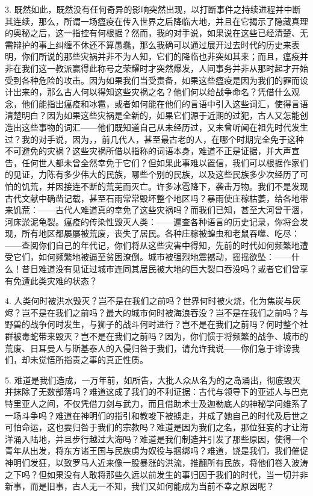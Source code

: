 3. 既然如此，既然没有任何奇异的影响突然出现，以打断事件之持续进程并中断其连续，那么，所谓一场瘟疫在传入世界之后降临大地，并且在它揭示了隐藏真理的奥秘之后，这一指控有何根据？然而，我的对手说，如果说在这些已经清楚、无需辩护的事上纠缠不休还不算愚蠢，那么我确可以通过展开过去时代的历史来表明，你们所说的那些灾祸并非不为人知，它们的降临也非突如其来；而且，瘟疫并非在我们这一教派赢得此称号之荣耀时才突然爆发，人间事务并非从那时起才开始受到各种危险的攻击。因为如果我们当受责备，如果这些瘟疫是因为我们的罪而设计出来的，那么古人何以得知这些灾祸之名？他们何以给战争命名？凭借什么观念，他们能指出瘟疫和冰雹，或者如何能在他们的言语中引入这些词汇，使得言语清楚明白？因为如果这些灾祸是全新的，如果它们源于近期的过犯，古人又怎能创造出这些事物的词汇——他们既知道自己从未经历过，又未曾听闻在祖先时代发生过？我的对手说，因为，，前几代人，甚至最古老的人，在哪个时期完全免于这种不可避免的灾祸？这些灾祸所借以指称的词语本身，难道不正是证据，并大声宣告，任何世人都未曾全然幸免于它们？但如果此事难以置信，我们可以根据作家们的见证，力陈有多少伟大的民族，哪些个别的民族，以及这些民族多少次经历了可怕的饥荒，并因接连不断的荒芜而灭亡。许多冰雹降下，袭击万物。我们不是发现古代文献中确凿记载，甚至石雨常常毁坏整个地区吗？暴雨使庄稼枯萎，给各地带来饥荒：——古代人难道真的幸免了这些灾祸吗？而我们已知，甚至大河曾干涸，河床淤泥龟裂。瘟疫的传染性毁灭人类：——遍查各种语言的历史记录，你将会发现，所有地区都屡屡被荒废，丧失了居民。各种庄稼被蝗虫和老鼠吞噬、吃尽：——查阅你们自己的年代记，你们将从这些灾害中得知，先前的时代如何频繁地遭受它们，如何频繁地被逼至贫困潦倒。城市被强烈地震撼动，摇摇欲坠：——什么！昔日难道没有见证过城市连同其居民被大地的巨大裂口吞没吗？或者它们曾享有免遭此类灾难的状态？\par

4. 人类何时被洪水毁灭？岂不是在我们之前吗？世界何时被火烧，化为焦炭与灰烬？岂不是在我们之前吗？最大的城市何时被海浪吞没？岂不是在我们之前吗？与野兽的战争何时发生，与狮子的战斗何时进行？岂不是在我们之前吗？何时整个社群被毒蛇带来毁灭？岂不是在我们之前吗？因为，你们惯于将频繁的战争、城市的荒废、日耳曼人与斯基泰人的入侵归咎于我们，请允许我说——你们急于诽谤我们，却未觉悟所指责之事的真正性质。\par

5. 难道是我们造成，一万年前，如所告，大批人众从名为的之岛涌出，彻底毁灭并抹除了无数部落吗？难道这成了我们的不利证据：古代与领导下的亚述人与巴克特里亚人之间，不仅凭借刀剑与武力，而且借助术士及迦勒底人的神秘学问维系了一场斗争吗？难道在神明们的指引和教唆下被掳走，并成了她自己的时代及后世之可怕命运，这也要归咎于我们的宗教吗？难道是因为我们之名，那位狂妄的才让海洋涌入陆地，并且步行越过大海吗？难道是我们制造并引发了那些原因，使得一个青年从出发，将东方诸王国与民族虏为奴役与捆绑吗？难道，饶是我们，我们催促神明们发狂，以致罗马人近来像一股暴涨的洪流，推翻所有民族，将他们卷入波涛之下吗？但如果没有人敢将那些久远以前发生的事归因于我们的时代，当一切并非新事，而是旧事，古人无一不知，我们又如何能成为当前不幸之原因呢？\par

